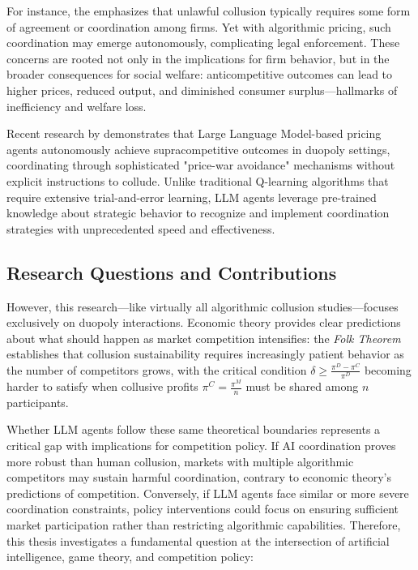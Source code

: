 For instance, the \textcite{us_department_of_justice_price_2021} emphasizes that unlawful collusion typically requires some form of agreement or coordination among firms. Yet with algorithmic pricing, such coordination may emerge autonomously, complicating legal enforcement. These concerns are rooted not only in the implications for firm behavior, but in the broader consequences for social welfare: anticompetitive outcomes can lead to higher prices, reduced output, and diminished consumer surplus—hallmarks of inefficiency and welfare loss.

Recent research by \textcite{fish_algorithmic_2025} demonstrates that Large Language Model-based pricing agents autonomously achieve supracompetitive outcomes in duopoly settings, coordinating through sophisticated "price-war avoidance" mechanisms without explicit instructions to collude. Unlike traditional Q-learning algorithms that require extensive trial-and-error learning, LLM agents leverage pre-trained knowledge about strategic behavior to recognize and implement coordination strategies with unprecedented speed and effectiveness.


\subsection{Research Questions and Contributions}
However, this research—like virtually all algorithmic collusion studies—focuses exclusively on duopoly interactions. Economic theory provides clear predictions about what should happen as market competition intensifies: the \emph{Folk Theorem} establishes that collusion sustainability requires increasingly patient behavior as the number of competitors grows, with the critical condition $\delta \geq \frac{\pi^D - \pi^C}{\pi^D}$ becoming harder to satisfy when collusive profits $\pi^C = \frac{\pi^M}{n}$ must be shared among $n$ participants.

Whether LLM agents follow these same theoretical boundaries represents a critical gap with implications for competition policy. If AI coordination proves more robust than human collusion, markets with multiple algorithmic competitors may sustain harmful coordination, contrary to economic theory's predictions of competition. Conversely, if LLM agents face similar or more severe coordination constraints, policy interventions could focus on ensuring sufficient market participation rather than restricting algorithmic capabilities. Therefore, this thesis investigates a fundamental question at the intersection of artificial intelligence, game theory, and competition policy:


